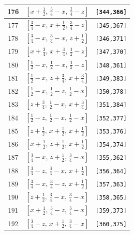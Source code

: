\documentclass[fleqn,8pt]{jsarticle}
\begin{document}
\begin{longtable}{ccc}
176 & $\left[ x + \frac{1}{2},\, \frac{3}{4} - x,\, \frac{3}{4} - z \right]$ & {\tt [344,366]} \\ \hline
177 & $\left[ \frac{3}{4} - x,\, x + \frac{1}{2},\, \frac{3}{4} - z \right]$ & {\tt [345,367]} \\ \hline
178 & $\left[ \frac{3}{4} - x,\, \frac{3}{4} - x,\, z + \frac{1}{2} \right]$ & {\tt [346,371]} \\ \hline
179 & $\left[ x + \frac{3}{4},\, x + \frac{3}{4},\, \frac{1}{2} - z \right]$ & {\tt [347,370]} \\ \hline
180 & $\left[ \frac{1}{2} - x,\, \frac{1}{2} - x,\, \frac{1}{2} - z \right]$ & {\tt [348,361]} \\ \hline
181 & $\left[ \frac{1}{2} - x,\, z + \frac{3}{4},\, x + \frac{3}{4} \right]$ & {\tt [349,383]} \\ \hline
182 & $\left[ \frac{1}{2} - x,\, \frac{1}{2} - z,\, \frac{1}{2} - x \right]$ & {\tt [350,378]} \\ \hline
183 & $\left[ z + \frac{3}{4},\, \frac{1}{2} - x,\, x + \frac{3}{4} \right]$ & {\tt [351,384]} \\ \hline
184 & $\left[ \frac{1}{2} - z,\, \frac{1}{2} - x,\, \frac{1}{2} - x \right]$ & {\tt [352,377]} \\ \hline
185 & $\left[ z + \frac{1}{2},\, x + \frac{1}{2},\, x + \frac{1}{2} \right]$ & {\tt [353,376]} \\ \hline
186 & $\left[ x + \frac{1}{2},\, z + \frac{1}{2},\, x + \frac{1}{2} \right]$ & {\tt [354,374]} \\ \hline
187 & $\left[ \frac{3}{4} - x,\, z + \frac{1}{2},\, \frac{3}{4} - x \right]$ & {\tt [355,362]} \\ \hline
188 & $\left[ \frac{3}{4} - z,\, \frac{3}{4} - x,\, x + \frac{1}{2} \right]$ & {\tt [356,364]} \\ \hline
189 & $\left[ \frac{3}{4} - x,\, \frac{3}{4} - z,\, x + \frac{1}{2} \right]$ & {\tt [357,363]} \\ \hline
190 & $\left[ z + \frac{1}{2},\, \frac{3}{4} - x,\, \frac{3}{4} - x \right]$ & {\tt [358,365]} \\ \hline
191 & $\left[ x + \frac{1}{2},\, \frac{3}{4} - z,\, \frac{3}{4} - x \right]$ & {\tt [359,373]} \\ \hline
192 & $\left[ \frac{3}{4} - z,\, x + \frac{1}{2},\, \frac{3}{4} - x \right]$ & {\tt [360,375]} \\
\end{longtable}
\renewcommand{\arraystretch}{1.2}
\end{document}

